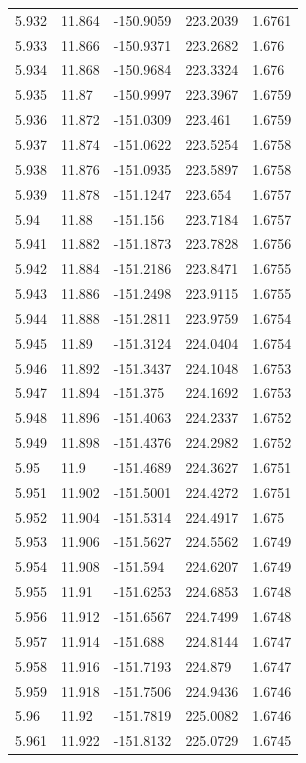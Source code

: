 \begin{tabular}{lllll}
5.932 & 11.864 & -150.9059 & 223.2039 & 1.6761 \\
5.933 & 11.866 & -150.9371 & 223.2682 & 1.676 \\
5.934 & 11.868 & -150.9684 & 223.3324 & 1.676 \\
5.935 & 11.87 & -150.9997 & 223.3967 & 1.6759 \\
5.936 & 11.872 & -151.0309 & 223.461 & 1.6759 \\
5.937 & 11.874 & -151.0622 & 223.5254 & 1.6758 \\
5.938 & 11.876 & -151.0935 & 223.5897 & 1.6758 \\
5.939 & 11.878 & -151.1247 & 223.654 & 1.6757 \\
5.94 & 11.88 & -151.156 & 223.7184 & 1.6757 \\
5.941 & 11.882 & -151.1873 & 223.7828 & 1.6756 \\
5.942 & 11.884 & -151.2186 & 223.8471 & 1.6755 \\
5.943 & 11.886 & -151.2498 & 223.9115 & 1.6755 \\
5.944 & 11.888 & -151.2811 & 223.9759 & 1.6754 \\
5.945 & 11.89 & -151.3124 & 224.0404 & 1.6754 \\
5.946 & 11.892 & -151.3437 & 224.1048 & 1.6753 \\
5.947 & 11.894 & -151.375 & 224.1692 & 1.6753 \\
5.948 & 11.896 & -151.4063 & 224.2337 & 1.6752 \\
5.949 & 11.898 & -151.4376 & 224.2982 & 1.6752 \\
5.95 & 11.9 & -151.4689 & 224.3627 & 1.6751 \\
5.951 & 11.902 & -151.5001 & 224.4272 & 1.6751 \\
5.952 & 11.904 & -151.5314 & 224.4917 & 1.675 \\
5.953 & 11.906 & -151.5627 & 224.5562 & 1.6749 \\
5.954 & 11.908 & -151.594 & 224.6207 & 1.6749 \\
5.955 & 11.91 & -151.6253 & 224.6853 & 1.6748 \\
5.956 & 11.912 & -151.6567 & 224.7499 & 1.6748 \\
5.957 & 11.914 & -151.688 & 224.8144 & 1.6747 \\
5.958 & 11.916 & -151.7193 & 224.879 & 1.6747 \\
5.959 & 11.918 & -151.7506 & 224.9436 & 1.6746 \\
5.96 & 11.92 & -151.7819 & 225.0082 & 1.6746 \\
5.961 & 11.922 & -151.8132 & 225.0729 & 1.6745 \\

\end{tabular}
